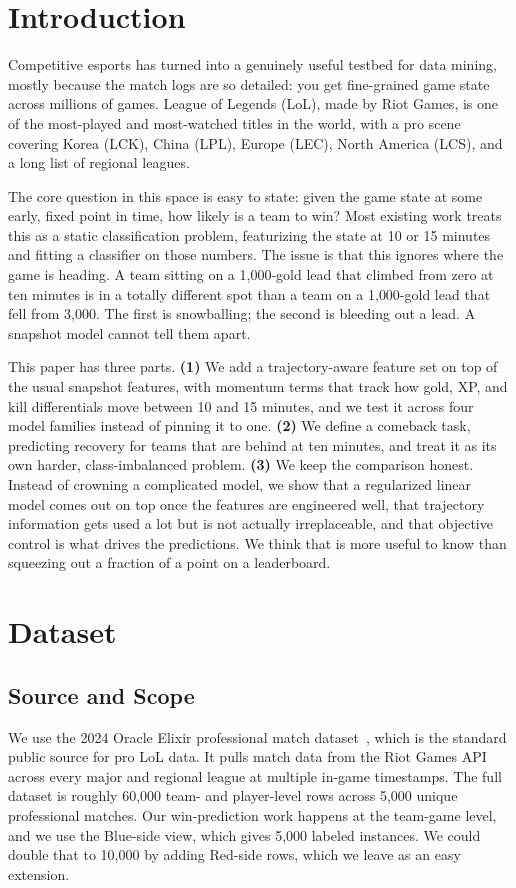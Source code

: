 \documentclass[sigconf,nonacm]{acmart}
\begin{document}
\section{Introduction}
Competitive esports has turned into a genuinely useful testbed for data mining, mostly because the
match logs are so detailed: you get fine-grained game state across millions of games. League of
Legends (LoL), made by Riot Games, is one of the most-played and most-watched titles in the world,
with a pro scene covering Korea (LCK), China (LPL), Europe (LEC), North America (LCS), and a long
list of regional leagues.

The core question in this space is easy to state: given the game state at some early, fixed point
in time, how likely is a team to win? Most existing work treats this as a static classification
problem, featurizing the state at 10 or 15 minutes and fitting a classifier on those numbers. The
issue is that this ignores where the game is heading. A team sitting on a 1{,}000-gold lead that
climbed from zero at ten minutes is in a totally different spot than a team on a 1{,}000-gold lead
that fell from 3{,}000. The first is snowballing; the second is bleeding out a lead. A snapshot
model cannot tell them apart.

This paper has three parts. \textbf{(1)} We add a trajectory-aware feature set on top of the usual
snapshot features, with momentum terms that track how gold, XP, and kill differentials move
between 10 and 15 minutes, and we test it across four model families instead of pinning it to one.
\textbf{(2)} We define a comeback task, predicting recovery for teams that are behind at ten
minutes, and treat it as its own harder, class-imbalanced problem. \textbf{(3)} We keep the
comparison honest. Instead of crowning a complicated model, we show that a regularized linear model
comes out on top once the features are engineered well, that trajectory information gets used a lot
but is not actually irreplaceable, and that objective control is what drives the predictions. We
think that is more useful to know than squeezing out a fraction of a point on a leaderboard.

\section{Dataset}
\subsection{Source and Scope}
We use the 2024 Oracle Elixir professional match dataset~\cite{oracleselixir}, which is the
standard public source for pro LoL data. It pulls match data from the Riot Games API across every
major and regional league at multiple in-game timestamps. The full dataset is roughly 60{,}000
team- and player-level rows across 5{,}000 unique professional matches. Our win-prediction work
happens at the team-game level, and we use the Blue-side view, which gives 5{,}000 labeled
instances. We could double that to 10{,}000 by adding Red-side rows, which we leave as an easy
extension.
\end{document}
